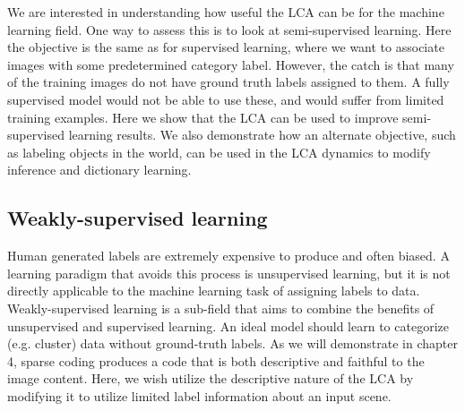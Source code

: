 We are interested in understanding how useful the LCA can be for the machine learning field.
One way to assess this is to look at semi-supervised learning. Here the objective is the same as for supervised learning, where we want to associate images with some predetermined category label.
However, the catch is that many of the training images do not have ground truth labels assigned to them.
A fully supervised model would not be able to use these, and would suffer from limited training examples.
Here we show that the LCA can be used to improve semi-supervised learning results.
We also demonstrate how an alternate objective, such as labeling objects in the world, can be used in the LCA dynamics to modify inference and dictionary learning.

\subsection{Weakly-supervised learning}

Human generated labels are extremely expensive to produce and often biased.
A learning paradigm that avoids this process is unsupervised learning, but it is not directly applicable to the machine learning task of assigning labels to data.
Weakly-supervised learning is a sub-field that aims to combine the benefits of unsupervised and supervised learning.
An ideal model should learn to categorize (e.g. cluster) data without ground-truth labels.
As we will demonstrate in chapter 4, sparse coding produces a code that is both descriptive and faithful to the image content. %
Here, we wish utilize the descriptive nature of the LCA by modifying it to utilize limited label information about an input scene.

